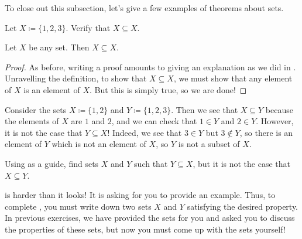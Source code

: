 \documentclass[../notes.tex]{subfiles}
\begin{document}
To close out this subsection, let's give a few examples of theorems about sets.
\begin{exercise}
    Let $X\coloneqq\{1,2,3\}$. Verify that $X\subseteq X$.
\end{exercise}
\begin{proposition}
    Let $X$ be any set. Then $X\subseteq X$.
\end{proposition}
\begin{proof}
    As before, writing a proof amounts to giving an explanation as we did in . Unravelling the definition, to show that $X\subseteq X$, we must show that any element of $X$ is an element of $X$. But this is simply true, so we are done!
\end{proof}
\begin{example} \label{ex:subset-but-neq}
    Consider the sets $X\coloneqq\{1,2\}$ and $Y\coloneqq\{1,2,3\}$. Then we see that $X\subseteq Y$ because the elements of $X$ are $1$ and $2$, and we can check that $1\in Y$ and $2\in Y$. However, it is not the case that $Y\subseteq X$! Indeed, we see that $3\in Y$ but $3\notin Y$, so there is an element of $Y$ which is not an element of $X$, so $Y$ is not a subset of $X$.
\end{example}
\begin{exercise} \label{exe:subset-but-neq}
    Using  as a guide, find sets $X$ and $Y$ such that $Y\subseteq X$, but it is not the case that $X\subseteq Y$.
\end{exercise}
 is harder than it looks! It is asking for you to provide an example. Thus, to complete , you must write down two sets $X$ and $Y$ satisfying the desired property. In previous exercises, we have provided the sets for you and asked you to discuss the properties of these sets, but now you must come up with the sets yourself!
\end{document}
